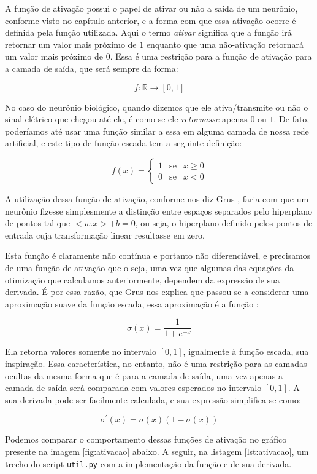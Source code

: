 A função de ativação possui o papel de ativar ou não a saída de um neurônio, conforme visto no capítulo anterior, e a forma com que essa ativação ocorre é definida pela função utilizada. Aqui o termo \emph{ativar} significa que a função irá retornar um valor mais próximo de $1$ enquanto que uma não-ativação retornará um valor mais próximo de $0$. Essa é uma restrição para a função de ativação para a camada de saída, que será sempre da forma:

\[ f: \mathbb{R} \rightarrow [0, 1] \]

No caso do neurônio biológico, quando dizemos que ele ativa/transmite ou não o sinal elétrico que chegou até ele, é como se ele \emph{retornasse} apenas $0$ ou $1$. De fato, poderíamos até usar uma função similar a essa em alguma camada de nossa rede artificial, e este tipo de função escada tem a seguinte definição:

\[
f(x) = 
\left\{
\begin{array}{lcr}
1 & \text{se} & x \geq 0\\
0 & \text{se} & x < 0
\end{array}
\right.
\]

A utilização dessa função de ativação, conforme nos diz Grus \citep{data}, faria com que um neurônio fizesse simplesmente a distinção entre espaços separados pelo hiperplano de pontos tal que $ <w.x> + b = 0$, ou seja, o hiperplano definido pelos pontos de entrada cuja transformação linear resultasse em zero.

Esta função é claramente não contínua e portanto não diferenciável, e precisamos de uma função de ativação que o seja, uma vez que algumas das equações da otimização que calculamos anteriormente, dependem da expressão de sua derivada. É por essa razão, que Grus \citep{data} nos explica que passou-se a considerar uma aproximação suave da função escada, essa aproximação é a função :

\[
\sigma(x) = \frac{1}{1 + e^{-x}}
\]

Ela retorna valores somente no intervalo $[0, 1]$, igualmente à função escada, sua inspiração. Essa característica, no entanto, não é uma restrição para as camadas ocultas da mesma forma que é para a camada de saída, uma vez apenas a camada de saída será comparada com valores esperados no intervalo $[0, 1]$. A sua derivada pode ser facilmente calculada, e sua expressão simplifica-se como:

\[
\sigma^{'}(x) = \sigma(x)(1-\sigma(x))
\]

Podemos comparar o comportamento dessas funções de ativação no gráfico presente na imagem \ref{fig:ativacao} abaixo. A seguir, na listagem \ref{lst:ativacao}, um trecho do script \texttt{util.py} com a implementação da função  e de sua derivada.

